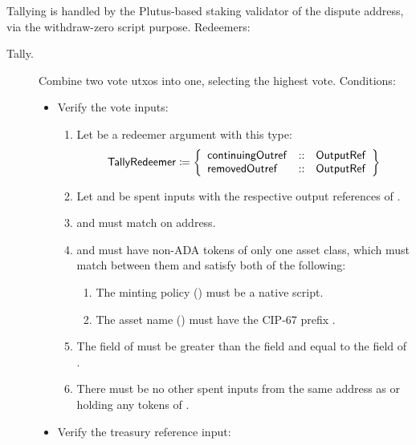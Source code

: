\documentclass[../hydrozoa.tex]{subfiles}
\begin{document}
Tallying is handled by the Plutus-based staking validator of the dispute address, via the withdraw-zero script purpose.
Redeemers:
\begin{description}
  \item[Tally.] Combine two vote utxos into one, selecting the highest vote.
    Conditions:
    \begin{itemize}
      \item Verify the vote inputs:
        \begin{enumerate}
          \item Let  be a redeemer argument with this type:
            \begin{equation*}
              \mathsf{TallyRedeemer} \coloneq \left\{
              \begin{array}{lll}
                \mathsf{continuingOutref} &::& \mathsf{OutputRef} \\
                \mathsf{removedOutref} &::& \mathsf{OutputRef}
              \end{array}\right\}
            \end{equation*}
          \item Let  and  be spent inputs with the respective output references of .
          \item {} and  must match on address.
          \item {} and  must have non-ADA tokens of only one asset class, which must match between them and satisfy both of the following:
            \begin{enumerate}
              \item The minting policy () must be a native script.
              \item The asset name () must have the CIP-67 prefix .
            \end{enumerate}
          \item The  field of  must be greater than the  field and equal to the  field of .
          \item There must be no other spent inputs from the same address as  or holding any tokens of .
        \end{enumerate}
      \item Verify the treasury reference input:

\end{itemize}
\end{description}
\end{document}
